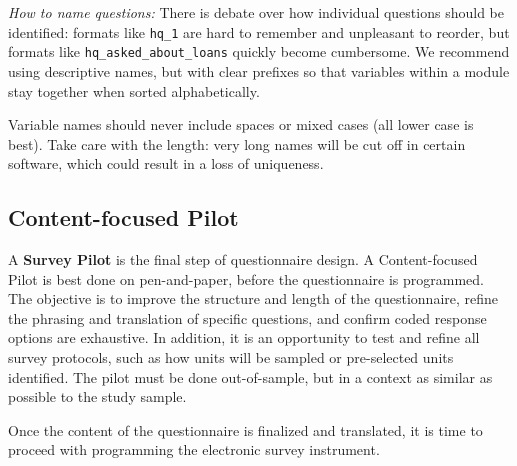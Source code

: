\textit{How to name questions:}
There is debate over how individual questions should be identified: formats like \texttt{hq\_1} are hard to remember and unpleasant to reorder, but formats like \texttt{hq\_asked\_about\_loans} quickly become cumbersome.
We recommend using descriptive names, but with clear prefixes so that variables within a module stay together when sorted alphabetically. { Variable names should never include spaces or mixed cases (all lower case is best). Take care with the length: very long names will be cut off in certain software, which could result in a loss of uniqueness. 

\subsection{Content-focused Pilot}
A \textbf{Survey Pilot}  is the final step of questionnaire design. 
A Content-focused Pilot   is best done on pen-and-paper, before the questionnaire is programmed. 
The objective is to improve the structure and length of the questionnaire, refine the phrasing and translation of specific questions, and confirm coded response options are exhaustive. 
In addition, it is an opportunity to test and refine all survey protocols, such as how units will be sampled or pre-selected units identified. The pilot must be done out-of-sample, but in a context as similar as possible to the study sample.

Once the content of the questionnaire is finalized and translated, it is time to proceed with programming the electronic survey instrument.



}
